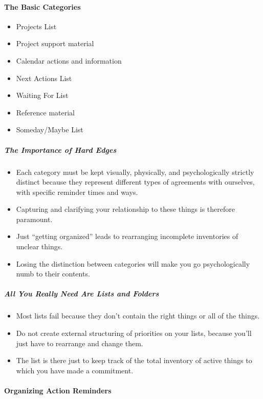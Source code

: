 \documentclass{article}
\begin{document}
\paragraph{The Basic Categories}

\begin{itemize}
  \item Projects List
  \item Project support material
  \item Calendar actions and information
  \item Next Actions List
  \item Waiting For List
  \item Reference material
  \item Someday/Maybe List
\end{itemize}

\subparagraph{The Importance of Hard Edges}

\begin{itemize}
  \item Each category must be kept visually, physically, and psychologically stric\-tly distinct because they represent different types of agreements with ourselves, with specific reminder times and ways.
  \item Capturing and clarifying your relationship to these things is therefore paramount.
  \item Just ``getting organized'' leads to rearranging incomplete inventories of unclear things.
  \item Losing the distinction between categories will make you go psychologically numb to their contents.
\end{itemize}

\subparagraph{All You Really Need Are Lists and Folders}

\begin{itemize}
  \item Most lists fail because they don't contain the right things or all of the things.
  \item Do not create external structuring of priorities on your lists, because you'll just have to rearrange and change them.
  \item The list is there just to keep track of the total inventory of active things to which you have made a commitment.
\end{itemize}

\paragraph{Organizing Action Reminders}
\end{document}
